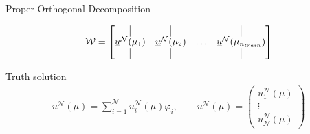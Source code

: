 \begin{frame}{Proper Orthogonal Decomposition}
	\Large{}
	\normalsize
	
	\begin{align*}
	\mathcal{W} = 
	\begin{bmatrix} 
	\vline & \vline & & \vline\\ 
	\underline{u}^{\mathcal{ N }}(\mu_{1}) & \underline{u}^{\mathcal{ N }}(\mu_{2}) & \hdots & \underline{u}^{\mathcal{ N }}(\mu_{n_{train}})  \\
	\vline & \vline & & \vline 
	\end{bmatrix}
	\end{align*}
	
	Truth solution
	\begin{align*}
	u^{\mathcal{ N }}(\mu) = \sum_{i=1}^{\mathcal{ N }} u_{i}^{\mathcal{ N }}(\mu) \varphi_i, 
	\qquad
	\underline{u}^{\mathcal{ N }}(\mu) = 
	\begin{pmatrix}
	u_{1}^{\mathcal{ N }}(\mu)\\  \vdots \\ u_{\mathcal{ N }}^{\mathcal{ N }}(\mu)
	\end{pmatrix}
	\end{align*}
	
	
\end{frame}


